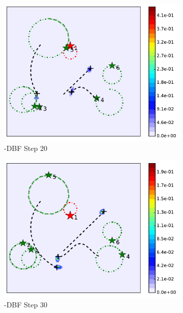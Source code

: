 \begin{figure}
\begin{subfigure}[b]{0.23\textwidth}
			\includegraphics[width=\textwidth]{figures/hetero_mov_sen_mov_tar_rbt1_step20}
			\caption{\proto-DBF Step 20}\label{fig:step20}
		\end{subfigure}
		\begin{subfigure}[b]{0.23\textwidth}
			\includegraphics[width=\textwidth]{figures/hetero_mov_sen_mov_tar_rbt1_step30}
			\caption{\proto-DBF Step 30}\label{fig:step30}
		\end{subfigure}
		\begin{subfigure}[b]{0.23\textwidth}

\end{subfigure}
\end{figure}
